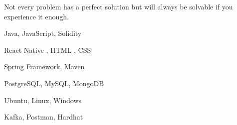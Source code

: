 \documentclass[11pt]{spidercv}
\begin{document}
    \begin{SideBar}{\ColorBackground}{\ColorTextSide}
        
        
        {   Not every problem has a perfect solution but will always be solvable if you experience it enough.
        }
      
       
        
        \vspace*{1cm}
        
       
        
        \vspace*{1cm}

        \begin{ItemList}{\ColorHighlight}
            \item [\faCode] Java, JavaScript, Solidity
            \item [\faFileCodeO]  React Native , HTML , CSS
            \item [\faCubes]  Spring Framework, Maven
            \item [\faDatabase]  PostgreSQL, MySQL, MongoDB
            \item [\faLinux]  Ubuntu, Linux, Windows
            \item [\faGears]  Kafka, Postman, Hardhat
        \end{ItemList}

        \vspace*{1cm}


        \begin{SpiderDiagram}{\ColorTextSide}{\ColorHighlight}
        \end{SpiderDiagram}

        \vspace*{1cm}


        \begin{SkillGauges}{\ColorHighlight}
        \end{SkillGauges}

    \end{SideBar}
\end{document}
